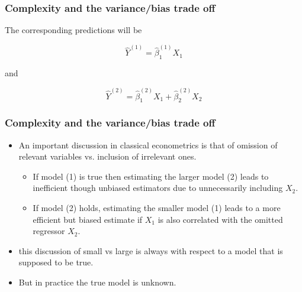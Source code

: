 \documentclass[
  shownotes,
  xcolor={svgnames},
  hyperref={colorlinks,citecolor=DarkBlue,linkcolor=DarkRed,urlcolor=DarkBlue}
  ]{beamer}
\begin{document}
\begin{frame}
\frametitle{Complexity and the variance/bias trade off}

The corresponding predictions will be

\begin{equation}\label{eq:3_2_3}
\hat{Y}^{(1)}=\hat{\beta}^{(1)}_1 X_1 
\end{equation}

and

\begin{equation}\label{eq:3_2_4}
\hat{Y}^{(2)}=\hat{\beta}^{(2)}_1 X_1 + \hat{\beta}^{(2)}_2 X_2 
\end{equation}

\end{frame}

\begin{frame}
\frametitle{Complexity and the variance/bias trade off}

\begin{itemize}
  \item An important discussion in classical econometrics is that of omission of relevant variables vs. inclusion of irrelevant ones. 
  \begin{itemize}
    \item If model (1) is true then estimating the larger model (2) leads to inefficient though unbiased estimators due to unnecessarily including $X_2$. 
    \item If model (2) holds, estimating the smaller model (1) leads to a more efficient but biased estimate if $X_1$ is also correlated with the omitted regressor $X_2$. 
  \end{itemize}
  \bigskip
  \item this discussion of small vs large is always with respect to a model that is supposed to be true.
  \bigskip
\item  But in practice the true model is unknown. 
\bigskip
\end{itemize}


\end{frame}
\end{document}
